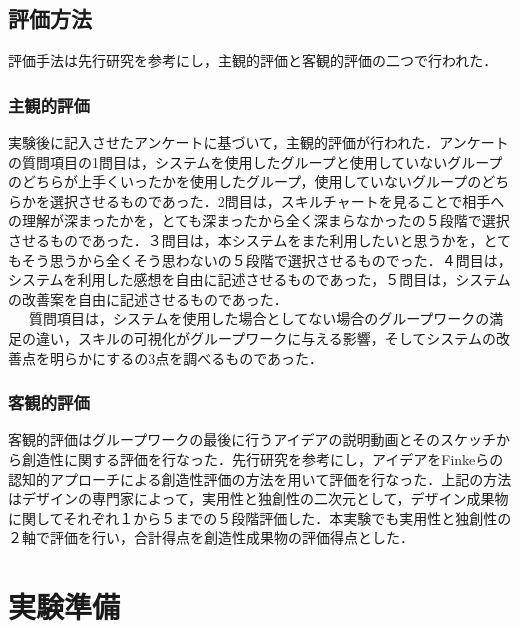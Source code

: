 \documentclass{funthesis}
\begin{document}
\subsection{評価方法}
評価手法は先行研究\cite{A17}を参考にし，主観的評価と客観的評価の二つで行われた．
\subsubsection{主観的評価}
実験後に記入させたアンケートに基づいて，主観的評価が行われた．アンケートの質問項目の1問目は，システムを使用したグループと使用していないグループのどちらが上手くいったかを使用したグループ，使用していないグループのどちらかを選択させるものであった．2問目は，スキルチャートを見ることで相手への理解が深まったかを，とても深まったから全く深まらなかったの５段階で選択させるものであった．３問目は，本システムをまた利用したいと思うかを，とてもそう思うから全くそう思わないの５段階で選択させるものでった．４問目は，システムを利用した感想を自由に記述させるものであった，５問目は，システムの改善案を自由に記述させるものであった．\\
\ \ \ 質問項目は，システムを使用した場合としてない場合のグループワークの満足の違い，スキルの可視化がグループワークに与える影響，そしてシステムの改善点を明らかにするの3点を調べるものであった．　　　　　　　　　　　　　　　　　　　　　　　　　　　　　　　　　　　　　　　　　　　　　　　　　　　　　　　　
\subsubsection{客観的評価}
客観的評価はグループワークの最後に行うアイデアの説明動画とそのスケッチから創造性に関する評価を行なった．先行研究\cite{A18}を参考にし，アイデアをFinkeら\cite{A19}の認知的アプローチによる創造性評価の方法を用いて評価を行なった．上記の方法はデザインの専門家によって，実用性と独創性の二次元として，デザイン成果物に関してそれぞれ１から５までの５段階評価した．本実験でも実用性と独創性の２軸で評価を行い，合計得点を創造性成果物の評価得点とした．

\section{実験準備}
\end{document}
